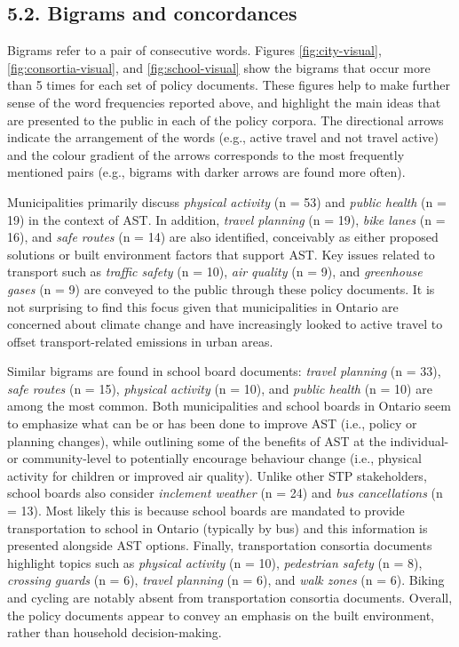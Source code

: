 \documentclass[]{elsarticle} %
\begin{document}
\hypertarget{bigrams-and-concordances}{%
\subsection{5.2. Bigrams and
concordances}\label{bigrams-and-concordances}}

Bigrams refer to a pair of consecutive words. Figures
\ref{fig:city-visual}, \ref{fig:consortia-visual}, and
\ref{fig:school-visual} show the bigrams that occur more than 5 times
for each set of policy documents. These figures help to make further
sense of the word frequencies reported above, and highlight the main
ideas that are presented to the public in each of the policy corpora.
The directional arrows indicate the arrangement of the words (e.g.,
active travel and not travel active) and the colour gradient of the
arrows corresponds to the most frequently mentioned pairs (e.g., bigrams
with darker arrows are found more often).

Municipalities primarily discuss \emph{physical activity} (n = 53) and
\emph{public health} (n = 19) in the context of AST. In addition,
\emph{travel planning} (n = 19), \emph{bike lanes} (n = 16), and
\emph{safe routes} (n = 14) are also identified, conceivably as either
proposed solutions or built environment factors that support AST. Key
issues related to transport such as \emph{traffic safety} (n = 10),
\emph{air quality} (n = 9), and \emph{greenhouse gases} (n = 9) are
conveyed to the public through these policy documents. It is not
surprising to find this focus given that municipalities in Ontario are
concerned about climate change and have increasingly looked to active
travel to offset transport-related emissions in urban areas.

Similar bigrams are found in school board documents: \emph{travel
planning} (n = 33), \emph{safe routes} (n = 15), \emph{physical
activity} (n = 10), and \emph{public health} (n = 10) are among the most
common. Both municipalities and school boards in Ontario seem to
emphasize what can be or has been done to improve AST (i.e., policy or
planning changes), while outlining some of the benefits of AST at the
individual- or community-level to potentially encourage behaviour change
(i.e., physical activity for children or improved air quality). Unlike
other STP stakeholders, school boards also consider \emph{inclement
weather} (n = 24) and \emph{bus cancellations} (n = 13). Most likely
this is because school boards are mandated to provide transportation to
school in Ontario (typically by bus) and this information is presented
alongside AST options. Finally, transportation consortia documents
highlight topics such as \emph{physical activity} (n = 10),
\emph{pedestrian safety} (n = 8), \emph{crossing guards} (n = 6),
\emph{travel planning} (n = 6), and \emph{walk zones} (n = 6). Biking
and cycling are notably absent from transportation consortia documents.
Overall, the policy documents appear to convey an emphasis on the built
environment, rather than household decision-making.
\end{document}
